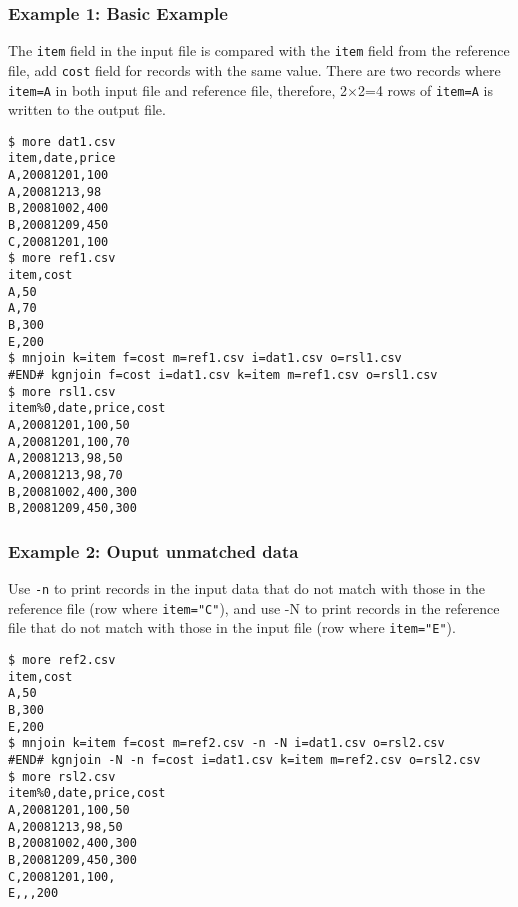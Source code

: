 \subsubsection*{Example 1: Basic Example }

The \verb|item| field in the input file is compared with the \verb|item| field from the reference file, add \verb|cost| field for records with the same value. There are two records where \verb|item=A| in both input file and reference file, therefore, 2$\times$2=4 rows of \verb|item=A| is written to the output file.


\begin{Verbatim}[baselinestretch=0.7,frame=single]
$ more dat1.csv
item,date,price
A,20081201,100
A,20081213,98
B,20081002,400
B,20081209,450
C,20081201,100
$ more ref1.csv
item,cost
A,50
A,70
B,300
E,200
$ mnjoin k=item f=cost m=ref1.csv i=dat1.csv o=rsl1.csv
#END# kgnjoin f=cost i=dat1.csv k=item m=ref1.csv o=rsl1.csv
$ more rsl1.csv
item%0,date,price,cost
A,20081201,100,50
A,20081201,100,70
A,20081213,98,50
A,20081213,98,70
B,20081002,400,300
B,20081209,450,300
\end{Verbatim}
\subsubsection*{Example 2: Ouput unmatched data}

Use \verb|-n| to print records in the input data that do not match with those in the reference file (row where \verb|item="C"|), and use -N to print records in the reference file that do not match with those in the input file (row where \verb|item="E"|).


\begin{Verbatim}[baselinestretch=0.7,frame=single]
$ more ref2.csv
item,cost
A,50
B,300
E,200
$ mnjoin k=item f=cost m=ref2.csv -n -N i=dat1.csv o=rsl2.csv
#END# kgnjoin -N -n f=cost i=dat1.csv k=item m=ref2.csv o=rsl2.csv
$ more rsl2.csv
item%0,date,price,cost
A,20081201,100,50
A,20081213,98,50
B,20081002,400,300
B,20081209,450,300
C,20081201,100,
E,,,200
\end{Verbatim}
